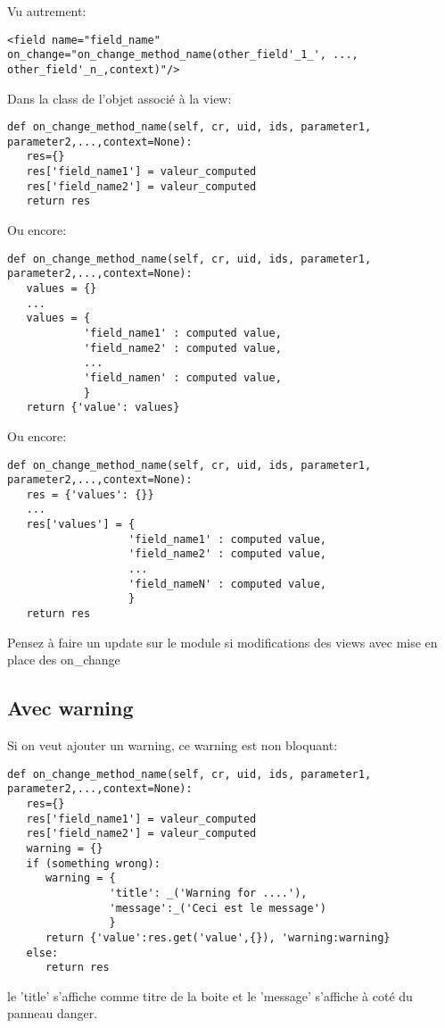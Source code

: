 \documentclass[12pt,a4paper]{article}
\begin{document}
Vu autrement:

\begin{verbatim}
<field name="field_name" on_change="on_change_method_name(other_field'_1_', ..., other_field'_n_,context)"/>
\end{verbatim}

Dans la class de l'objet associé à la view:
\begin{verbatim}
def on_change_method_name(self, cr, uid, ids, parameter1, parameter2,...,context=None):
   res={}
   res['field_name1'] = valeur_computed
   res['field_name2'] = valeur_computed
   return res
\end{verbatim}


Ou encore:
\begin{verbatim}
def on_change_method_name(self, cr, uid, ids, parameter1, parameter2,...,context=None):
   values = {}
   ...
   values = {
            'field_name1' : computed value,
            'field_name2' : computed value,
            ...
            'field_namen' : computed value,
            }
   return {'value': values}
\end{verbatim}

Ou encore:
\begin{verbatim}
def on_change_method_name(self, cr, uid, ids, parameter1, parameter2,...,context=None):
   res = {'values': {}}
   ...
   res['values'] = {
                   'field_name1' : computed value,
                   'field_name2' : computed value,
                   ...
                   'field_nameN' : computed value,
                   }
   return res
\end{verbatim}
Pensez à faire un update sur le module si modifications des views avec mise en place des on\_change
\subsection{Avec warning}
\label{sec:warning}
Si on veut ajouter un warning, ce warning est non bloquant:
\begin{verbatim}
def on_change_method_name(self, cr, uid, ids, parameter1, parameter2,...,context=None):
   res={}
   res['field_name1'] = valeur_computed
   res['field_name2'] = valeur_computed
   warning = {}
   if (something wrong):
      warning = {
                'title': _('Warning for ....'),
                'message':_('Ceci est le message')
                }
      return {'value':res.get('value',{}), 'warning:warning}
   else:
      return res
\end{verbatim}
le 'title' s'affiche comme titre de la boite et le 'message' s'affiche à coté du panneau danger.
\end{document}
